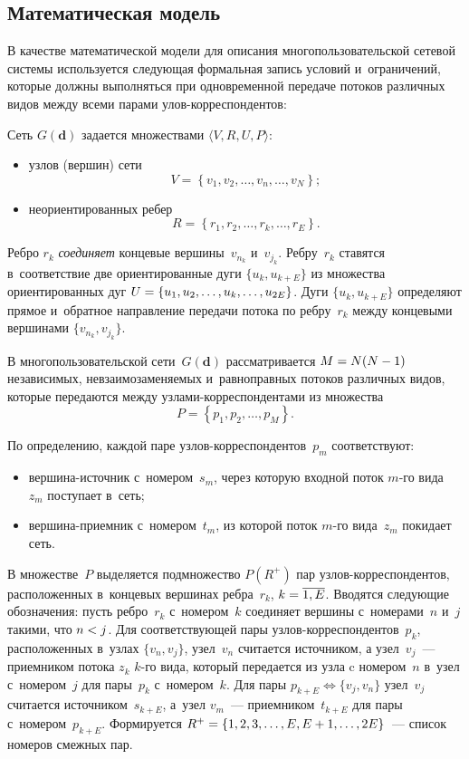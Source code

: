 \begin{multicols}{2}
\section{Математическая модель}

В качестве математической модели для описания
многопользовательской сетевой системы используется следующая
формальная запись условий и~ограничений, которые должны
выполняться при одновременной передаче потоков различных видов
между всеми парами улов-корреспондентов:

Сеть $G(\mathbf{d})$ задается множествами $\langle V,
R,U,P\rangle$:
\begin{itemize}
\item  узлов (вершин) сети 
$$
V=\left \{v_{1}, v_{2},\dots,v_{n},\dots,v_{N}\right\};
$$
\item  неориентированных ребер 
$$
R=\left\{r_{1}, r_{2}, \dots, r_{k}, \dots,
r_{E}\right\}.
$$
\end{itemize}

Ребро $r_{k}$ \textit{соединяет} концевые вершины~$v_{n_k}$ и~$v_{j_k}$. 
Реб\-ру~$r_{k}$ ставятся в~соответствие две
ориентированные дуги $\{u_{k},u_{k+E}\}$ из множества
ориентированных дуг $U\hm=\{u_{1}, u_{2}, \dots, u_{k}, \dots,
u_{2E}\}$. Дуги $\{u_{k}, u_{k+E}\}$ определяют прямое и~обратное
на\-прав\-ле\-ние передачи потока по реб\-ру~$r_{k}$ между концевыми
вершинами $\{v_{n_k}, v_{j_k}\}$.

В многопользовательской сети~$G(\mathbf{d})$ рассматривается
$M\hm=N(N\hm-1)$ независимых, невзаимозаменяемых и~равноправных потоков
различных видов, которые передаются между уз\-ла\-ми-кор\-рес\-пон\-ден\-та\-ми
из множества 
$$
P=\left\{p_{1}, p_{2}, \dots, p_{M}\right\}.
$$

По определению, каждой паре уз\-лов-кор\-рес\-пон\-ден\-тов~$p_{m}$
соответствуют:
\begin{itemize}
\item вершина-ис\-точ\-ник с~номером~$s_{m}$, через которую входной поток
$m$-го вида~$z_{m}$ поступает в~сеть;
\item  вершина-при\-ем\-ник с~номером~$t_{m}$, из которой поток $m$-го
вида~$z_{m}$ покидает сеть.
\end{itemize}

В множестве~$P$ выделяется подмножество $P(R^{+})$ пар
уз\-лов-кор\-рес\-пон\-ден\-тов, расположенных в~концевых вершинах
ребра~$r_{k}$, $k\hm=\overline{1,E}$. Вводятся сле\-ду\-ющие обозначения:
пусть ребро~$r_{k}$  с~номером~$k$ соединяет вершины с~номерами~$n$ и~$j$ такими, что $n\hm< j$. Для со\-от\-вет\-ст\-ву\-ющей пары
уз\-лов-кор\-рес\-пон\-ден\-тов~$p_{k}$, расположенных в~узлах $\{v_{n},
v_{j}\}$, узел~$v_{n}$ считается источником, а узел~$v_{j}$~---
приемником потока $z_{k}$ $k$-го вида, который передается из узла
c номером~$n$ в~узел с~номером~$j$ для пары~$p_{k}$ с~номером~$k$.
Для пары $p^{}_{k+E} \Longleftrightarrow \{v_{j},v_{n}\}$ узел~$v_{j}$ 
считается источником~$s_{k+E}$, а~узел $v_m$~--- приемником~$t_{k+E}$ для пары с~номером~$p_{k+E}$. Формируется
$R^+\hm=\{1,2,3,\dots,E,E+1,\dots,2E\}$~--- список номеров смежных
пар.


\end{multicols}
